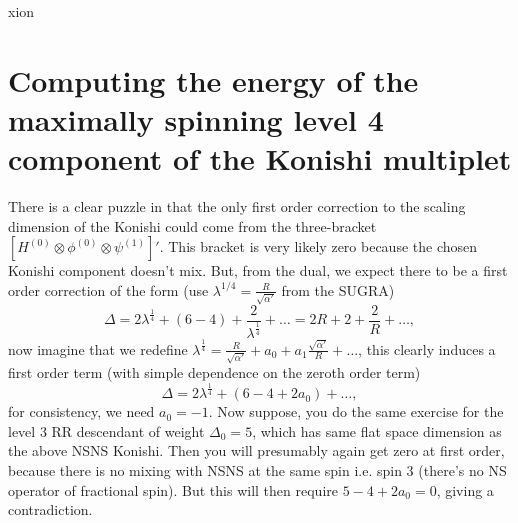 xion\documentclass[12pt]{article}
\def\be{\begin{equation}}
\def\ee{\end{equation}}
\numberwithin{equation}{section}
\begin{document}
\section{Computing the energy of the maximally spinning level 4 component of the Konishi multiplet}
There is a clear puzzle in that the only first order correction to the scaling dimension of the Konishi could come from the three-bracket $[H^{(0)} \otimes \phi^{(0)} \otimes \psi^{(1)}]'$. This bracket is very likely zero because the chosen Konishi component doesn't mix. But, from the dual, we expect there to be a first order correction of the form (use $\lambda^{1/4} = \frac{R}{\sqrt{\alpha'}}$ from the SUGRA)
\be
\Delta = 2\lambda^\frac{1}{4} + (6-4) + \frac{2}{\lambda^{\frac{1}{4}}} + \ldots = 2 R + 2 + \frac{2}{R} + \ldots,
\ee
now imagine that we redefine $\lambda^\frac{1}{4} = \frac{R}{\sqrt{\alpha'}} + a_0 + a_1 \frac{\sqrt{\alpha'}}{R} + \ldots$, this clearly induces a first order term (with simple dependence on the zeroth order term)
\be
\Delta = 2\lambda^\frac{1}{4} + (6-4 + 2 a_0) + \ldots,
\ee
for consistency, we need $a_0 = -1$. Now suppose, you do the same exercise for the level 3 RR descendant of weight $\Delta_0 = 5$, which has same flat space dimension as the above NSNS Konishi. Then you will presumably again get zero at first order, because there is no mixing with NSNS at the same spin i.e. spin 3 (there's no NS operator of fractional spin). But this will then require $5 - 4 + 2 a_0 = 0$, giving a contradiction.
\end{document}

